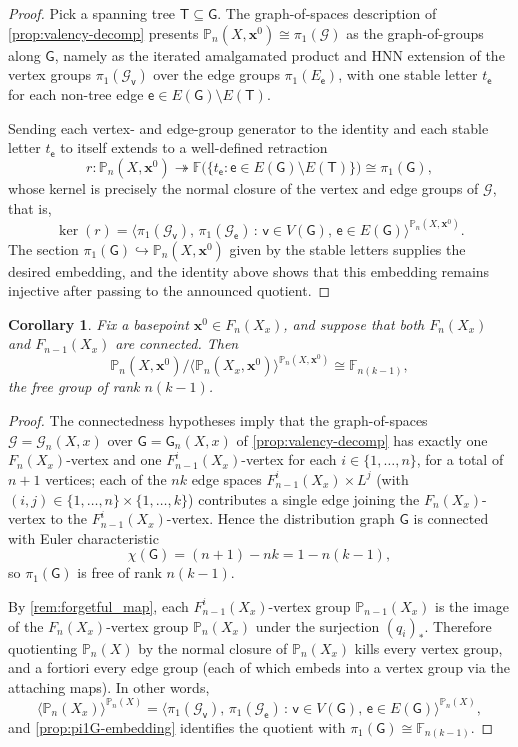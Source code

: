 \documentclass[reqno]{amsart}
\newtheorem{corollary}[theorem]{Corollary}
\theoremstyle{definition}
\newcommand\bfx{\mathbf{x}}
\newcommand\cG{\mathcal{G}}
\newcommand\sfG{\mathsf{G}}
\newcommand\sfT{\mathsf{T}}
\newcommand\sfe{\mathsf{e}}
\newcommand\sfv{\mathsf{v}}
\newcommand{\PB}{\mathbb{P}}
\newcommand{\co}[1]{\mathopen{\langle}#1\mathclose{\rangle}} %
\newcommand{\base}{\bfx^0}
\numberwithin{equation}{section}
\begin{document}
\begin{proof}
Pick a spanning tree \(\sfT\subseteq \sfG\). The graph-of-spaces
description of \cref{prop:valency-decomp} presents
\(\PB_n(X,\base)\cong\pi_1(\cG)\) as the graph-of-groups
along \(\sfG\), namely as the iterated amalgamated product and HNN
extension of the vertex groups \(\pi_1(\cG_\sfv)\) over the edge groups
\(\pi_1(E_\sfe)\), with one stable letter \(t_\sfe\) for each non-tree edge
\(\sfe\in E(\sfG)\setminus E(\sfT)\).

Sending each vertex- and edge-group generator to the identity and
each stable letter \(t_\sfe\) to itself extends to a well-defined
retraction
\[
r\colon \PB_n(X,\base) \twoheadrightarrow
\mathbb{F}\bigl(\{t_\sfe : \sfe\in E(\sfG)\setminus E(\sfT)\}\bigr)
\cong \pi_1(\sfG),
\]
whose kernel is precisely the normal closure of the vertex and
edge groups of \(\cG\), that is,
\[
\ker(r) =
\co{\pi_1(\cG_\sfv),\,\pi_1(\cG_\sfe)\,:\,\sfv\in V(\sfG),\,\sfe\in E(\sfG)}^{\PB_n(X,\base)}.
\]
The section \(\pi_1(\sfG)\hookrightarrow\PB_n(X,\base)\) given by the
stable letters supplies the desired embedding, and the identity
above shows that this embedding remains injective after passing to
the announced quotient.
\end{proof}

\begin{corollary}\label{cor:valency-quotient}
Fix a basepoint \(\base\in F_n(X_x)\), and suppose that both
\(F_n(X_x)\) and \(F_{n-1}(X_x)\) are connected. Then
\[
\PB_n(X,\base)\big/\co{\PB_n(X_x,\base)}^{\PB_n(X,\base)}
\cong
\mathbb{F}_{n(k-1)},
\]
the free group of rank \(n(k-1)\).
\end{corollary}

\begin{proof}
The connectedness hypotheses imply that the graph-of-spaces
\(\cG=\cG_n(X,x)\) over \(\sfG=\sfG_n(X,x)\) of
\cref{prop:valency-decomp} has exactly one
\(F_n(X_x)\)-vertex and one \(F_{n-1}^i(X_x)\)-vertex for each
\(i\in\{1,\dots,n\}\), for a total of \(n+1\) vertices; each of the
\(nk\) edge spaces \(F_{n-1}^i(X_x)\times L^j\) (with
\((i,j)\in\{1,\dots,n\}\times\{1,\dots,k\}\)) contributes a single
edge joining the \(F_n(X_x)\)-vertex to the \(F_{n-1}^i(X_x)\)-vertex.
Hence the distribution graph \(\sfG\) is connected with
Euler characteristic
\[
\chi(\sfG) = (n+1)-nk = 1-n(k-1),
\]
so \(\pi_1(\sfG)\) is free of rank \(n(k-1)\).

By \cref{rem:forgetful_map}, each \(F_{n-1}^i(X_x)\)-vertex
group \(\PB_{n-1}(X_x)\) is the image of the \(F_n(X_x)\)-vertex group
\(\PB_n(X_x)\) under the surjection \((q_i)_\ast\). Therefore
quotienting \(\PB_n(X)\) by the normal closure of
\(\PB_n(X_x)\) kills every vertex group, and a fortiori every
edge group (each of which embeds into a vertex group via the
attaching maps). In other words,
\[
\co{\PB_n(X_x)}^{\PB_n(X)}=
\co{\pi_1(\cG_\sfv),\,\pi_1(\cG_\sfe)\,:\,\sfv\in V(\sfG),\,
\sfe\in E(\sfG)}^{\PB_n(X)},
\]
and \cref{prop:pi1G-embedding} identifies the quotient
with \(\pi_1(\sfG)\cong\mathbb{F}_{n(k-1)}\).
\end{proof}
\end{document}
